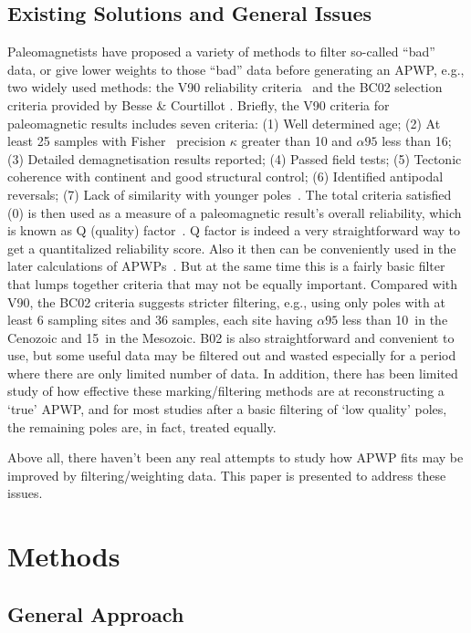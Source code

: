 \subsection{Existing Solutions and General Issues}

Paleomagnetists have proposed a variety of methods to filter so-called ``bad''
data, or give lower weights to those ``bad'' data before generating an APWP,
e.g., two widely used methods: the V90 reliability criteria~\cite{v90} and the
BC02 selection criteria provided by Besse \& Courtillot .
Briefly, the V90 criteria for paleomagnetic results includes seven criteria: (1)
Well determined age; (2) At least 25 samples with Fisher~\cite{F53} precision
$\kappa$ greater than 10 and $\alpha95$ less than 16\degree; (3) Detailed
demagnetisation results reported; (4) Passed field tests; (5) Tectonic coherence
with continent and good structural control; (6) Identified antipodal reversals;
(7) Lack of similarity with younger poles~\cite{T92}. The total criteria
satisfied (0) is then used as a measure of a paleomagnetic result's
overall reliability, which is known as Q (quality) factor~\cite{T92}. Q factor
is indeed a very straightforward way to get a quantitalized reliability score.
Also it then can be conveniently used in the later calculations of
APWPs~\cite{T92}. But at the same time this is a fairly basic filter that lumps
together criteria that may not be equally important. Compared with V90, the BC02
criteria suggests stricter filtering, e.g., using only poles with at least 6
sampling sites and 36 samples, each site having $\alpha95$ less than 10\degree\
in the Cenozoic and 15\degree\ in the Mesozoic. B02 is also straightforward and
convenient to use, but some useful data may be filtered out and wasted
especially for a period where there are only limited number of data. In
addition, there has been limited study of how effective these marking/filtering
methods are at reconstructing a `true' APWP, and for most studies after a basic
filtering of `low quality' poles, the remaining poles are, in fact, treated
equally.

Above all, there haven't been any real attempts to study how APWP fits may be
improved by filtering/weighting data. This paper is presented to address these
issues.


\section{Methods}

\subsection{General Approach}

